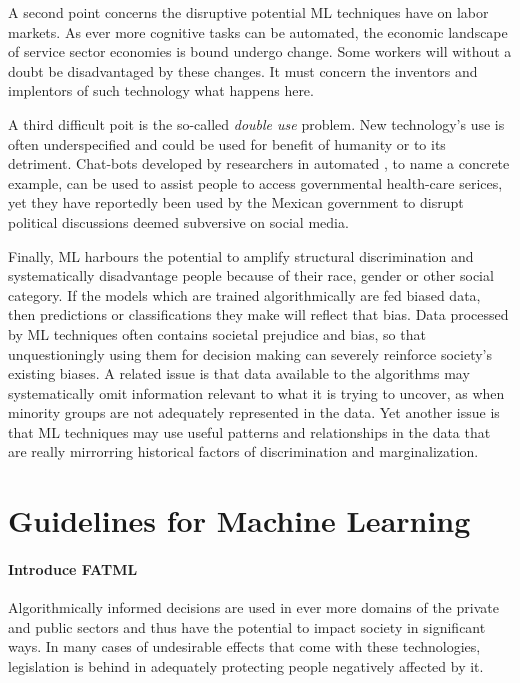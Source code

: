 \documentclass{article}
\begin{document}
A second point concerns the disruptive potential ML techniques have on labor markets. As ever more cognitive tasks can be automated, the economic landscape of service sector economies is bound undergo change. Some workers will without a doubt be disadvantaged by these changes. It must concern the inventors and implentors of such technology what happens here.

A third difficult poit is the so-called \emph{double use} problem. New technology's use is often underspecified and could be used for benefit of humanity or to its detriment. Chat-bots developed by researchers in automated , to name a concrete example, can be used to assist people to access governmental health-care serices, yet they have reportedly been used by the Mexican government to disrupt political discussions deemed subversive on social media. \cite{leidner2017ethical}

Finally, ML harbours the potential to amplify structural discrimination and systematically disadvantage people because of their race, gender or other social category. If the models which are trained algorithmically are fed biased data, then predictions or classifications they make will reflect that bias.
Data processed by ML techniques often contains societal prejudice and bias, so that unquestioningly using them for decision making can severely reinforce society's existing biases. A related issue is that data available to the algorithms may systematically omit information relevant to what it is trying to uncover, as when minority groups are not adequately represented in the data. Yet another issue is that ML techniques may use useful patterns and relationships in the data that are really mirrorring historical factors of discrimination and marginalization. \cite{barocas2016big}

\section{Guidelines for Machine Learning}\hypertarget{sec3}{}
\paragraph{Introduce FATML}
Algorithmically informed decisions are used in ever more domains of the private and public sectors and thus have the potential to impact society in significant ways. In many cases of undesirable effects that come with these technologies, legislation is behind in adequately protecting people negatively affected by it.
\end{document}
